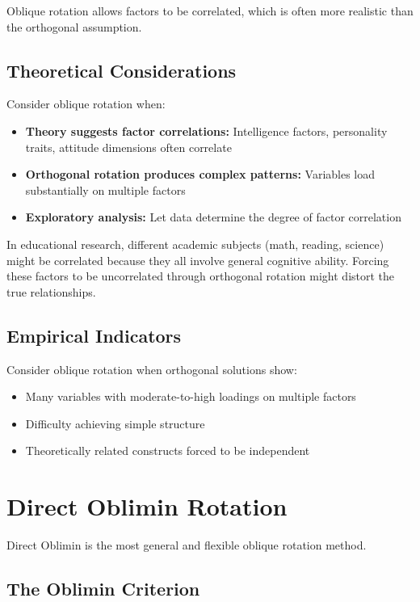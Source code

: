 \documentclass[a4paper]{tufte-book}
\begin{document}
Oblique rotation allows factors to be correlated, which is often more realistic than the orthogonal assumption.

\subsection{Theoretical Considerations}

Consider oblique rotation when:

\begin{itemize}
\item \textbf{Theory suggests factor correlations:} Intelligence factors, personality traits, attitude dimensions often correlate
\item \textbf{Orthogonal rotation produces complex patterns:} Variables load substantially on multiple factors
\item \textbf{Exploratory analysis:} Let data determine the degree of factor correlation
\end{itemize}

\begin{practicalapplication}
In educational research, different academic subjects (math, reading, science) might be correlated because they all involve general cognitive ability. Forcing these factors to be uncorrelated through orthogonal rotation might distort the true relationships.
\end{practicalapplication}

\subsection{Empirical Indicators}

Consider oblique rotation when orthogonal solutions show:
\begin{itemize}
\item Many variables with moderate-to-high loadings on multiple factors
\item Difficulty achieving simple structure
\item Theoretically related constructs forced to be independent
\end{itemize}

\section{Direct Oblimin Rotation}

Direct Oblimin is the most general and flexible oblique rotation method.

\subsection{The Oblimin Criterion}
\end{document}
